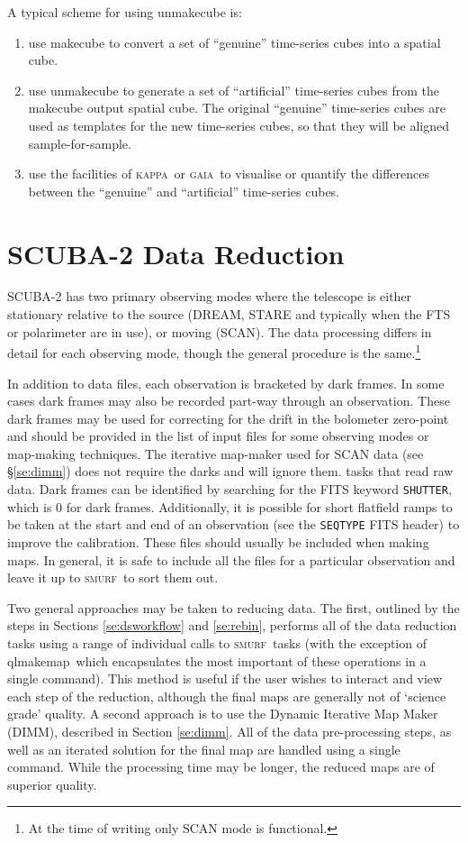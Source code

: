 \documentclass[twoside,11pt]{article}
\newcommand{\xref}[3]{#1}
\newcommand{\xlabel}[1]{}
\renewcommand{\_}{\texttt{\symbol{95}}}
\newcommand{\GAIA}{\textsc{gaia}}
\newcommand{\KAPPA}{\textsc{kappa}}
\newcommand{\SMURF}{\textsc{smurf}}
\newcommand{\task}[1]{\textsf{#1}}
\newcommand{\qlmakemap}{\xref{\task{qlmakemap}}{sun258}{QLMAKEMAP}}
\begin{document}
A typical scheme for using unmakecube is:

\begin{enumerate}
\item use makecube to convert a set of ``genuine'' time-series cubes into
a spatial cube.
\item use unmakecube to generate a set of ``artificial'' time-series cubes
from the makecube output spatial cube. The original ``genuine''
time-series cubes are used as templates for the new time-series cubes, so
that they will be aligned sample-for-sample.
\item use the facilities of \KAPPA\ or \GAIA\ to visualise or quantify the
differences between the ``genuine'' and ``artificial'' time-series cubes.
\end{enumerate}


\section{\xlabel{scuba2}SCUBA-2 Data Reduction\label{se:sc2dr}}

SCUBA-2 has two primary observing modes where the telescope is either
stationary relative to the source (DREAM, STARE and typically when the
FTS or polarimeter are in use), or moving (SCAN). The data processing
differs in detail for each observing mode, though the general
procedure is the same.\footnote{At the time of writing only SCAN mode
  is functional.}

In addition to data files, each observation is bracketed by dark
frames. In some cases dark frames may also be recorded part-way
through an observation. These dark frames may be used for correcting
for the drift in the bolometer zero-point and should be provided in
the list of input files for some observing modes or map-making
techniques. The iterative map-maker used for SCAN data (see
\S\ref{se:dimm}) does not require the darks and will ignore them.
 tasks that read raw data. Dark frames can be identified by searching
 for the FITS keyword \texttt{SHUTTER}, which is 0 for dark
 frames. Additionally, it is possible for short flatfield ramps to be
 taken at the start and end of an observation (see the
 \texttt{SEQ\_TYPE} FITS header) to improve the calibration. These
 files should usually be included when making maps. In general, it is
 safe to include all the files for a particular observation and leave
 it up to \SMURF\ to sort them out.

Two general approaches may be taken to reducing data. The first,
outlined by the steps in Sections \ref{se:dsworkflow} and
\ref{se:rebin}, performs all of the data reduction tasks using a range
of individual calls to \SMURF\ tasks (with the exception of
\qlmakemap\ which encapsulates the most important of these operations
in a single command). This method is useful if the user wishes to
interact and view each step of the reduction, although the final maps
are generally not of `science grade' quality. A second approach is to
use the Dynamic Iterative Map Maker (DIMM), described in Section
\ref{se:dimm}. All of the data pre-processing steps, as well as an
iterated solution for the final map are handled using a single
command. While the processing time may be longer, the reduced maps are
of superior quality.
\end{document}
